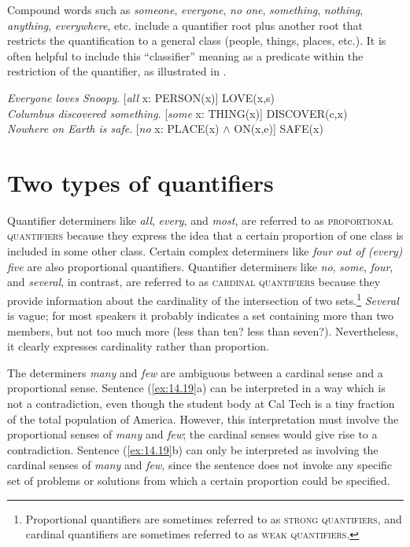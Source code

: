 Compound words such as \textit{someone}, \textit{everyone}, \textit{no one}, \textit{something}, \textit{nothing}, \textit{anything}, \textit{everywhere}, etc. include a quantifier root plus another root that restricts the quantification to a general class (people, things, places, etc.). It is often helpful to include this “classifier” meaning as a predicate within the restriction of the quantifier, as illustrated in .


\ea \label{ex:14.18}
\ea \textit{Everyone loves Snoopy}.         \hfill  [\textit{all} x: PERSON(x)] LOVE(x,s)\\
\ex \textit{Columbus discovered something}. \hfill [\textit{some} x: THING(x)] DISCOVER(c,x)\\
\ex \textit{Nowhere on Earth is safe}.      \hfill [\textit{no} x: PLACE(x) $\wedge$ ON(x,e)] SAFE(x)
                       \z
\z

\section{Two types of quantifiers}\label{sec:14.4}

Quantifier determiners like \textit{all}, \textit{every}, and \textit{most}, are referred to as \textsc{proportional quantifiers} because they express the idea that a certain proportion of one class is included in some other class. Certain complex determiners like \textit{four out of (every) five} are also proportional quantifiers. Quantifier determiners like \textit{no}, \textit{some}, \textit{four}, and \textit{several}, in contrast, are referred to as \textsc{cardinal quantifiers} because they provide information about the cardinality of the intersection of two sets.\footnote{Proportional quantifiers are sometimes referred to as \textsc{strong} \textsc{quantifiers}, and cardinal quantifiers are sometimes referred to as \textsc{weak} \textsc{quantifiers}.} \textit{Several} is vague; for most speakers it probably indicates a set containing more than two members, but not too much more (less than ten? less than seven?). Nevertheless, it clearly expresses cardinality rather than proportion.



The determiners \textit{many} and \textit{few} are ambiguous between a cardinal sense and a proportional sense. Sentence (\ref{ex:14.19}a) can be interpreted in a way which is not a contradiction, even though the student body at Cal Tech is a tiny fraction of the total population of America. However, this interpretation must involve the proportional senses of \textit{many} and \textit{few}; the cardinal senses would give rise to a contradiction. Sentence (\ref{ex:14.19}b) can only be interpreted as involving the cardinal senses of \textit{many} and \textit{few}, since the sentence does not invoke any specific set of problems or solutions from which a certain proportion could be specified.



